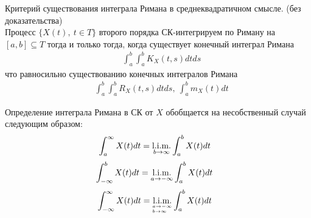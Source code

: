 \begin{theorem}
    Критерий существования интеграла Римана в среднеквадратичном смысле. (без
    доказательства)
    \\
    Процесс $\{X(t), \ t \in T\}$ второго порядка СК-интегрируем по Риману на
    $[a,b] \subseteq T$ тогда и только тогда, когда существует конечный интеграл
    Римана
    \begin{align*}
      & \int_a^b\int_a^b K_X(t,s) dt ds
    \end{align*}
    что равносильно существованию конечных интегралов Римана
    \begin{align*}
      & \int_a^b\int_a^b R_X(t,s) dt ds, \ \int_a^b m_X(t) dt
    \end{align*}  
\end{theorem}
\begin{Note}
    Определение интеграла Римана в СК от $X$ обобщается на несобственный случай
    следующим образом:
    \begin{align*}
      & \int_a^\infty X(t) dt = \underset{b \to \infty}{\text{l}.\text{i}.\text{m}.} \int_a^b X(t)dt
    \end{align*}
    \begin{align*}
      & \int_{-\infty}^b X(t)dt = \underset{a \to -\infty}{\text{l}.\text{i}.\text{m}.} \int_a^bX(t)dt
    \end{align*}
    \begin{align*}
      & \int_{-\infty}^\infty X(t) dt = \underset{^{a\to -\infty}_{b \to \infty}}{\text{l}.\text{i}.\text{m}.} \int_a^b X(t)dt
    \end{align*}
\end{Note}
